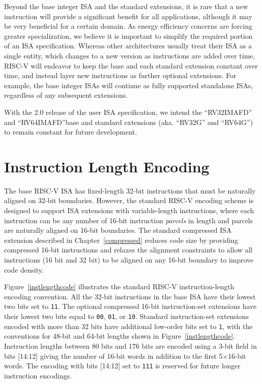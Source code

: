 Beyond the base integer ISA and the standard extensions, it is rare
that a new instruction will provide a significant benefit for all
applications, although it may be very beneficial for a certain domain.
As energy efficiency concerns are forcing greater specialization, we
believe it is important to simplify the required portion of an ISA
specification.  Whereas other architectures usually treat their ISA as
a single entity, which changes to a new version as instructions are
added over time, RISC-V will endeavor to keep the base and each
standard extension constant over time, and instead layer new
instructions as further optional extensions.  For example, the base
integer ISAs will continue as fully supported standalone ISAs,
regardless of any subsequent extensions.
\begin{commentary}
With the 2.0 release of the user ISA specification, we intend the
``RV32IMAFD'' and ``RV64IMAFD''base and standard extensions
(aka. ``RV32G'' and ``RV64G'') to remain constant for future
development.
\end{commentary}

\section{Instruction Length Encoding}

The base RISC-V ISA has fixed-length 32-bit instructions that must be
naturally aligned on 32-bit boundaries.  However, the standard RISC-V
encoding scheme is designed to support ISA extensions with
variable-length instructions, where each instruction can be any number
of 16-bit instruction {\em parcels} in length and parcels are
naturally aligned on 16-bit boundaries.  The standard compressed ISA
extension described in Chapter~\ref{compressed} reduces code size by
providing compressed 16-bit instructions and relaxes the alignment
constraints to allow all instructions (16 bit and 32 bit) to be
aligned on any 16-bit boundary to improve code density.

Figure~\ref{instlengthcode} illustrates the standard RISC-V
instruction-length encoding convention.  All the 32-bit instructions
in the base ISA have their lowest two bits set to {\tt 11}.  The
optional compressed 16-bit instruction-set extensions have their
lowest two bits equal to {\tt 00}, {\tt 01}, or {\tt 10}.  Standard
instruction-set extensions encoded with more than 32 bits have
additional low-order bits set to {\tt 1}, with the conventions for
48-bit and 64-bit lengths shown in Figure~\ref{instlengthcode}.
Instruction lengths between 80 bits and 176 bits are encoded using a
3-bit field in bits [14:12] giving the number of 16-bit words in
addition to the first 5$\times$16-bit words.  The encoding with bits
[14:12] set to {\tt 111} is reserved for future longer instruction
encodings.

